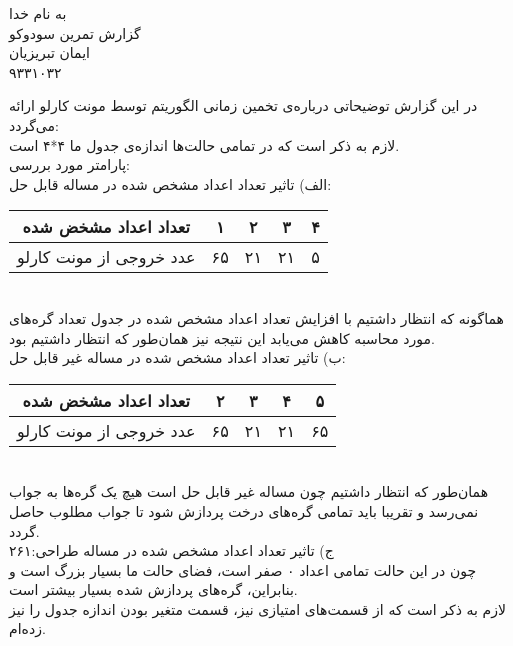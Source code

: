\documentclass{article}[12pt]
\begin{document}
\begin{center}
به نام خدا\\
گزارش تمرین سودوکو\\
ایمان تبریزیان\\
۹۳۳۱۰۳۲

\end{center}
در این گزارش توضیحاتی درباره‌ی تخمین زمانی الگوریتم توسط مونت کارلو ارائه می‌گردد:\\
لازم به ذکر است که در تمامی حالت‌ها اندازه‌ی جدول ما ۴*۴ است.\\
پارامتر مورد بررسی:\\
الف) تاثیر تعداد اعداد مشخص شده در مساله قابل حل:\\
\begin{tabular}{|c|c|c|c|c|}
\hline
تعداد اعداد مشخض شده & ۱ & ۲ & ۳ & ۴\\
\hline
عدد خروجی از مونت کارلو & ۶۵ & ۲۱ & ۲۱ & ۵\\

\hline

\end{tabular}\\


هماگونه که انتظار داشتیم با افزایش تعداد اعداد مشخص شده در جدول تعداد گره‌های مورد محاسبه کاهش می‌یابد این نتیجه نیز همان‌طور که انتظار داشتیم بود.\\
ب) تاثیر تعداد اعداد مشخص شده در مساله غیر قابل حل:\\
\begin{tabular}{|c|c|c|c|c|}
\hline
تعداد اعداد مشخض شده & ۲ & ۳ & ۴ & ۵\\
\hline
عدد خروجی از مونت کارلو & ۶۵ & ۲۱ & ۲۱ & ۶۵\\

\hline

\end{tabular}\\
همان‌طور که انتظار داشتیم چون مساله غیر قابل حل است هیچ یک گره‌ها به جواب نمی‌رسد و تقریبا باید تمامی گره‌های درخت پردازش شود تا جواب مطلوب حاصل گردد.\\
ج) تاثیر تعداد اعداد مشخص شده در مساله طراحی:۲۶۱\\
چون در این حالت تمامی اعداد ۰ صفر است، فضای حالت ما بسیار بزرگ است و بنابراین، گره‌های پردازش شده بسیار بیشتر است.\\
لازم به ذکر است که از قسمت‌های امتیازی نیز، قسمت متغیر بودن اندازه جدول را نیز زده‌ام.
\end{document}
